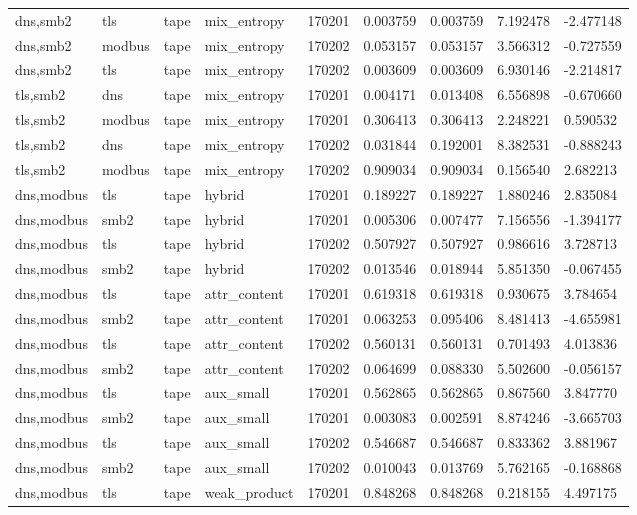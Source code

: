 \begin{tabular}{lllllllll}
dns,smb2 & tls & tape & mix\_entropy & 170201 & 0.003759 & 0.003759 & 7.192478 & -2.477148 \\
dns,smb2 & modbus & tape & mix\_entropy & 170202 & 0.053157 & 0.053157 & 3.566312 & -0.727559 \\
dns,smb2 & tls & tape & mix\_entropy & 170202 & 0.003609 & 0.003609 & 6.930146 & -2.214817 \\
tls,smb2 & dns & tape & mix\_entropy & 170201 & 0.004171 & 0.013408 & 6.556898 & -0.670660 \\
tls,smb2 & modbus & tape & mix\_entropy & 170201 & 0.306413 & 0.306413 & 2.248221 & 0.590532 \\
tls,smb2 & dns & tape & mix\_entropy & 170202 & 0.031844 & 0.192001 & 8.382531 & -0.888243 \\
tls,smb2 & modbus & tape & mix\_entropy & 170202 & 0.909034 & 0.909034 & 0.156540 & 2.682213 \\
dns,modbus & tls & tape & hybrid & 170201 & 0.189227 & 0.189227 & 1.880246 & 2.835084 \\
dns,modbus & smb2 & tape & hybrid & 170201 & 0.005306 & 0.007477 & 7.156556 & -1.394177 \\
dns,modbus & tls & tape & hybrid & 170202 & 0.507927 & 0.507927 & 0.986616 & 3.728713 \\
dns,modbus & smb2 & tape & hybrid & 170202 & 0.013546 & 0.018944 & 5.851350 & -0.067455 \\
dns,modbus & tls & tape & attr\_content & 170201 & 0.619318 & 0.619318 & 0.930675 & 3.784654 \\
dns,modbus & smb2 & tape & attr\_content & 170201 & 0.063253 & 0.095406 & 8.481413 & -4.655981 \\
dns,modbus & tls & tape & attr\_content & 170202 & 0.560131 & 0.560131 & 0.701493 & 4.013836 \\
dns,modbus & smb2 & tape & attr\_content & 170202 & 0.064699 & 0.088330 & 5.502600 & -0.056157 \\
dns,modbus & tls & tape & aux\_small & 170201 & 0.562865 & 0.562865 & 0.867560 & 3.847770 \\
dns,modbus & smb2 & tape & aux\_small & 170201 & 0.003083 & 0.002591 & 8.874246 & -3.665703 \\
dns,modbus & tls & tape & aux\_small & 170202 & 0.546687 & 0.546687 & 0.833362 & 3.881967 \\
dns,modbus & smb2 & tape & aux\_small & 170202 & 0.010043 & 0.013769 & 5.762165 & -0.168868 \\
dns,modbus & tls & tape & weak\_product & 170201 & 0.848268 & 0.848268 & 0.218155 & 4.497175 \\

\end{tabular}
